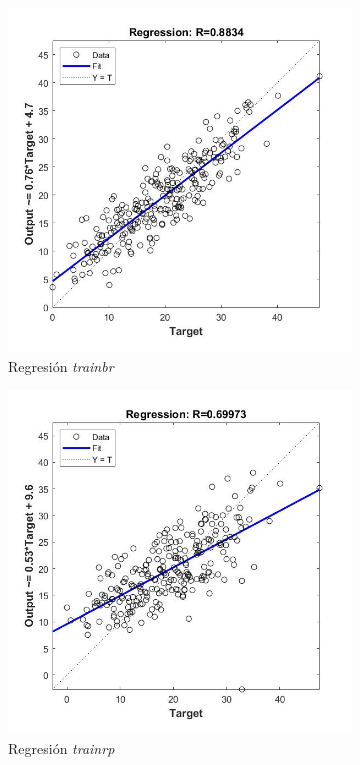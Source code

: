 \documentclass{article}
\begin{document}
\begin{figure}[H]
 \centering
 \begin{subfigure}{0.4\textwidth}
  \includegraphics[width=0.8\linewidth]{../images/I_ex3_regression_bodyfat_dataset_trainbr.jpg}
  \caption{Regresión \textit{trainbr}}
 \end{subfigure}
 \begin{subfigure}{0.4\textwidth}
  \includegraphics[width=0.8\linewidth]{../images/I_ex3_regression_bodyfat_dataset_trainrp.jpg}
  \caption{Regresión \textit{trainrp}}
 \end{subfigure}
 \begin{subfigure}{0.4\textwidth}

\end{subfigure}
\end{figure}
\end{document}
